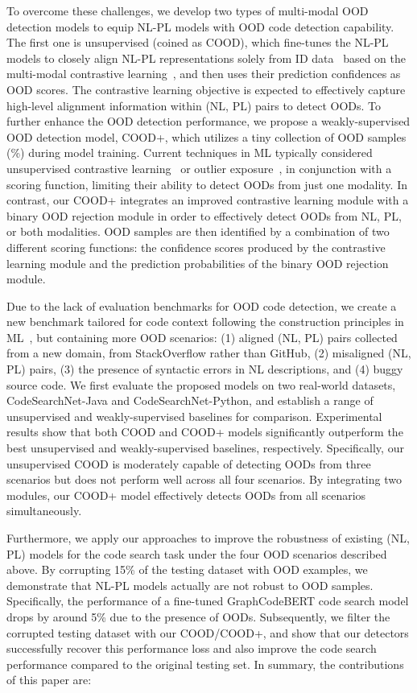To overcome these challenges, we develop two types of multi-modal OOD detection models to equip NL-PL models with OOD code detection capability. The first one is unsupervised (coined as COOD), which fine-tunes the NL-PL models to closely align NL-PL representations solely from ID data~\cite{husain2019codesearchnet} based on the multi-modal contrastive learning~\cite{oord2018representation}, and then uses their prediction confidences as OOD scores. The contrastive learning objective is expected to effectively capture high-level alignment information within (NL, PL) pairs to detect OODs. To further enhance the OOD detection performance, we propose a weakly-supervised OOD detection model, COOD+, which utilizes a tiny collection of OOD samples (\%) during model training. Current techniques in ML typically considered unsupervised contrastive learning~\cite{zhou2021contrastive} or outlier exposure~\cite{hendrycks2018deep, liu2020energy}, in conjunction with a scoring function, limiting their ability to detect OODs from just one modality. In contrast, our COOD+ integrates an improved contrastive learning module with a binary OOD rejection module in order to effectively detect OODs from NL, PL, or both modalities. OOD samples are then identified by a combination of two different scoring functions: the confidence scores produced by the contrastive learning module and the prediction probabilities of the binary OOD rejection module.

Due to the lack of evaluation benchmarks for OOD code detection, we create a new benchmark tailored for code context following the construction principles in ML~\cite{zhou2021contrastive, mai2022self}, but containing more OOD scenarios: (1) aligned (NL, PL) pairs collected from a new domain, \eg from StackOverflow rather than GitHub, (2) misaligned (NL, PL) pairs,  (3) the presence of syntactic errors in NL descriptions, and (4) buggy source code. We first evaluate the proposed models on two real-world datasets, CodeSearchNet-Java and CodeSearchNet-Python, and establish a range of unsupervised and weakly-supervised baselines for comparison. Experimental results show that both COOD and COOD+ models significantly outperform the best unsupervised and weakly-supervised baselines, respectively. Specifically, our unsupervised COOD is moderately capable of detecting OODs from three scenarios but does not perform well across all four scenarios. By integrating two modules, our COOD+ model effectively detects OODs from all scenarios simultaneously.

Furthermore, we apply our approaches to improve the robustness of existing (NL, PL) models for the code search task under the four OOD scenarios described above. By corrupting 15\% of the testing dataset with OOD examples, we demonstrate that NL-PL models actually are not robust to OOD samples. Specifically, the performance of a fine-tuned GraphCodeBERT code search model drops by around 5\% due to the presence of OODs. Subsequently, we filter the corrupted testing dataset with our COOD/COOD+, and show that our detectors successfully recover this performance loss and also improve the code search performance compared to the original testing set. In summary, the contributions of this paper are: 
 

